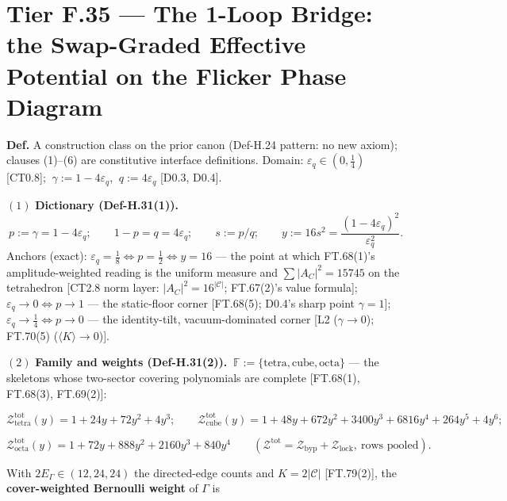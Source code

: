 \section[Tier F.35 — The 1-Loop Bridge: the Swap-Graded Effective…]{\texorpdfstring{Tier F.35 — The 1-Loop Bridge: the Swap-Graded Effective Potential on the Flicker Phase Diagram}{Tier F.35 - The 1-Loop Bridge: the Swap-Graded Effective Potential on the Flicker Phase Diagram}}

\begin{definition}\label{tag:Def-H-31}
\textbf{Def.} A construction class on the prior canon (Def-H.24 pattern: no new axiom); clauses (1)–(6) are constitutive interface definitions. Domain: $\varepsilon_q\in(0,\tfrac14)$ [CT0.8]; $\ \gamma:=1-4\varepsilon_q$, $\ q:=4\varepsilon_q$ [D0.3, D0.4].

$(1)$ \textbf{Dictionary (Def-H.31(1)).} $\ p:=\gamma=1-4\varepsilon_q;\qquad 1-p=q=4\varepsilon_q;\qquad s:=p/q;\qquad y:=16s^2=\dfrac{(1-4\varepsilon_q)^2}{\varepsilon_q^2}.$ Anchors (exact): $\varepsilon_q=\tfrac18\iff p=\tfrac12\iff y=16$ — the point at which FT.68(1)'s amplitude-weighted reading is the uniform measure and $\sum|A_C|^2=15745$ on the tetrahedron [CT2.8 norm layer: $|A_C|^2=16^{|\mathcal C|}$; FT.67(2)'s value formula]; $\varepsilon_q\to0\iff p\to1$ — the static-floor corner [FT.68(5); D0.4's sharp point $\gamma=1$]; $\varepsilon_q\to\tfrac14\iff p\to0$ — the identity-tilt, vacuum-dominated corner [L2 ($\gamma\to0$); FT.70(5) ($\langle K\rangle\to0$)].

$(2)$ \textbf{Family and weights (Def-H.31(2)).} $\ \mathbb F:=\{\text{tetra},\text{cube},\text{octa}\}$ — the skeletons whose two-sector covering polynomials are complete [FT.68(1), FT.68(3), FT.69(2)]:

\[
\mathcal Z^{\mathrm{tot}}_{\mathrm{tetra}}(y)=1+24y+72y^2+4y^3;\qquad
\mathcal Z^{\mathrm{tot}}_{\mathrm{cube}}(y)=1+48y+672y^2+3400y^3+6816y^4+264y^5+4y^6;
\]

\[
\mathcal Z^{\mathrm{tot}}_{\mathrm{octa}}(y)=1+72y+888y^2+2160y^3+840y^4
\qquad(\mathcal Z^{\mathrm{tot}}=\mathcal Z_{\mathrm{byp}}+\mathcal Z_{\mathrm{lock}},\ \text{rows pooled}).
\]

With $2E_\Gamma\in(12,24,24)$ the directed-edge counts and $K=2|\mathcal C|$ [FT.79(2)], the \textbf{cover-weighted Bernoulli weight} of $\Gamma$ is


\end{definition}
